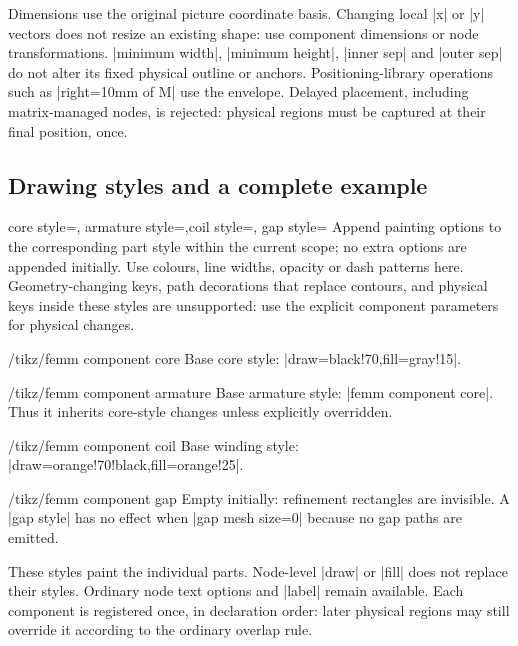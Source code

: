 Dimensions use the original picture coordinate basis. Changing local |x|
or |y| vectors does not resize an existing shape: use component dimensions or
node transformations. |minimum width|, |minimum height|, |inner sep| and
|outer sep| do not alter its fixed physical outline or anchors.
Positioning-library operations such as |right=10mm of M| use the envelope.
Delayed placement, including matrix-managed nodes, is rejected: physical
regions must be captured at their final position, once.

\subsection{Drawing styles and a complete example}
\begin{keylist}{core style=,
  armature style=,coil style=,
  gap style=}
Append painting options to the corresponding part style within the current
scope; no extra options are appended initially. Use colours, line widths,
opacity or dash patterns here. Geometry-changing keys, path decorations
that replace contours, and physical keys inside these styles are unsupported:
use the explicit component parameters for physical changes.
\end{keylist}
\begin{stylekey}{/tikz/femm component core}
Base core style: |draw=black!70,fill=gray!15|.
\end{stylekey}
\begin{stylekey}{/tikz/femm component armature}
Base armature style: |femm component core|. Thus it inherits core-style changes
unless explicitly overridden.
\end{stylekey}
\begin{stylekey}{/tikz/femm component coil}
Base winding style: |draw=orange!70!black,fill=orange!25|.
\end{stylekey}
\begin{stylekey}{/tikz/femm component gap}
Empty initially: refinement rectangles are invisible. A |gap style| has
no effect when |gap mesh size=0| because no gap paths are emitted.
\end{stylekey}
These styles paint the individual parts. Node-level |draw| or |fill| does not
replace their styles. Ordinary node text options and |label| remain available.
Each component is registered once, in declaration order: later physical
regions may still override it according to the ordinary overlap rule.

